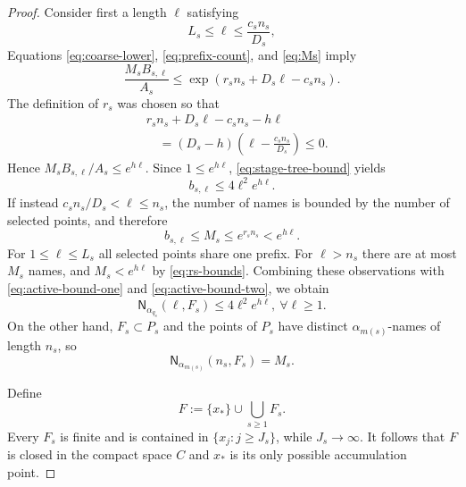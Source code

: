 \documentclass[12pt,letterpaper,reqno]{amsart}
\newcommand{\Nname}{\mathsf N}
\theoremstyle{definition}
\theoremstyle{remark}
\numberwithin{equation}{section}
\begin{document}
\begin{proof}
		Consider first a length $\ell$ satisfying
		\[
		L_s\leq\ell\leq\frac{c_sn_s}{D_s},
		\]
		Equations \eqref{eq:coarse-lower}, \eqref{eq:prefix-count}, and
		\eqref{eq:Ms} imply
		\[
		\frac{M_sB_{s,\ell}}{A_s}
		\leq
		\exp(r_sn_s+D_s\ell-c_sn_s).
		\]
		The definition of $r_s$ was chosen so that
		\[
		\begin{aligned}
		&r_sn_s+D_s\ell-c_sn_s-h\ell\\
		&\quad=
		(D_s-h)\left(\ell-\frac{c_sn_s}{D_s}\right)\leq0.
		\end{aligned}
		\]
		Hence $M_sB_{s,\ell}/A_s\leq e^{h\ell}$.  Since
		$1\leq e^{h\ell}$, \eqref{eq:stage-tree-bound} yields
		\begin{equation}
			b_{s,\ell}\leq4\ell^2e^{h\ell}.
			\label{eq:active-bound-one}
		\end{equation}
		If instead $c_sn_s/D_s<\ell\leq n_s$, the number of names is bounded by
		the number of selected points, and therefore
		\begin{equation}
			b_{s,\ell}\leq M_s
			\leq e^{r_sn_s}
			<e^{h\ell}.
			\label{eq:active-bound-two}
		\end{equation}
		For $1\leq\ell\leq L_s$ all selected points share one prefix.  For
		$\ell>n_s$ there are at most $M_s$ names, and
		$M_s<e^{h\ell}$ by \eqref{eq:rs-bounds}.  Combining these observations with
		\eqref{eq:active-bound-one} and \eqref{eq:active-bound-two}, we obtain
		\begin{equation}
			\Nname_{\alpha_{q_s}}(\ell,F_s)
			\leq4\ell^2e^{h\ell},~\forall\ell\geq1.
			\label{eq:cloud-upper}
		\end{equation}
		On the other hand, $F_s\subset P_s$ and the points of $P_s$ have distinct
		$\alpha_{m(s)}$-names of length $n_s$, so
		\begin{equation}
			\Nname_{\alpha_{m(s)}}(n_s,F_s)=M_s.
			\label{eq:cloud-lower}
		\end{equation}
		
		Define
		\begin{equation}
			F:=\{x_*\}\cup\bigcup_{s\geq1}F_s.
			\label{eq:F-definition}
		\end{equation}
		Every $F_s$ is finite and is contained in $\{x_j:j\geq J_s\}$, while
		$J_s\to\infty$.  
		It follows that $F$ is closed in the compact space $C$ and $x_*$ is its only possible
		accumulation point.
		

\end{proof}
\end{document}
